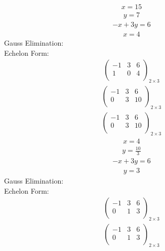 \documentclass{article}
\begin{document}
\begin{align*}
x=15\end{align*}
\begin{align*}
y=7\end{align*}
\begin{align*}
-x + 3y=6\end{align*}
\begin{align*}
x=4\end{align*}
Gauss Elimination:\\
Echelon Form:\\
\begin{align*}
\left(
\begin{array}{cc|c}
-1 & 3 & 6\\
1 & 0 & 4\\
\end{array}
\right)_{2\times 3}
\end{align*}
\begin{align*}
\left(
\begin{array}{cc|c}
-1 & 3 & 6\\
0 & 3 & 10\\
\end{array}
\right)_{2\times 3}
\end{align*}
\begin{align*}
\left(
\begin{array}{cc|c}
-1 & 3 & 6\\
0 & 3 & 10\\
\end{array}
\right)_{2\times 3}
\end{align*}
\begin{align*}
x=4\end{align*}
\begin{align*}
y=\frac{10}{3}\end{align*}
\begin{align*}
-x + 3y=6\end{align*}
\begin{align*}
y=3\end{align*}
Gauss Elimination:\\
Echelon Form:\\
\begin{align*}
\left(
\begin{array}{cc|c}
-1 & 3 & 6\\
0 & 1 & 3\\
\end{array}
\right)_{2\times 3}
\end{align*}
\begin{align*}
\left(
\begin{array}{cc|c}
-1 & 3 & 6\\
0 & 1 & 3\\
\end{array}
\right)_{2\times 3}
\end{align*}
\end{document}
